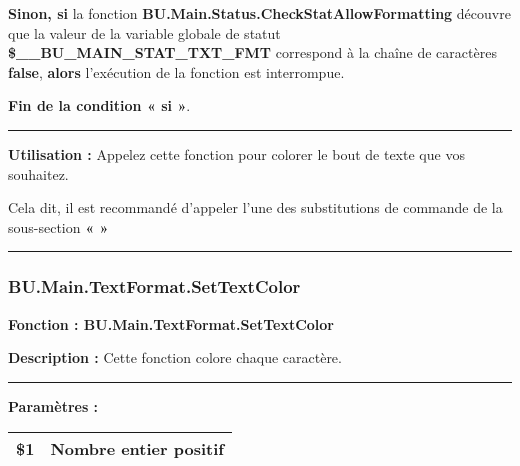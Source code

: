 \documentclass[a4paper,10pt]{article}
\begin{document}
\begin{justify}
    \textbf{\color{cond}Sinon, si} la fonction \textbf{\color{func}BU.Main.Status.CheckStatAllowFormatting} découvre que la valeur de la variable globale de statut \textbf{\color{vars}\$\_\_BU\_MAIN\_STAT\_TXT\_FMT} correspond à la chaîne de caractères \textbf{false}, \textbf{\color{cond}alors} l'exécution de la fonction est interrompue.
\end{justify}

\begin{justify}
    \textbf{\color{cond}Fin de la condition « si »}.
\end{justify}


\par\noindent\rule{\textwidth}{0.4pt}

\begin{justify}
    \textbf{Utilisation :} Appelez cette fonction pour colorer le bout de texte que vos souhaitez.
\end{justify}

\begin{justify}
    Cela dit, il est recommandé d'appeler l'une des substitutions de commande de la sous-section \textbf{\color{sec2}«  »}
\end{justify}






\color{sec3}\par\noindent\rule{\textwidth}{0.4pt}\color{text}

\color{sec3}
\subsubsection{BU.Main.TextFormat.SetTextColor}\color{text}

\begin{justify}
    \textbf{Fonction : \color{func}BU.Main.TextFormat.SetTextColor}
\end{justify}

\begin{justify}
    \textbf{Description :} Cette fonction colore chaque caractère.
\end{justify}


\par\noindent\rule{\textwidth}{0.4pt}

\begin{justify}
    \textbf{Paramètres :}

    \begin{tabular}{|l|l|}
        \hline
        \textbf{\color{orange}\$1} & Nombre entier positif\\
        \hline
    \end{tabular}
\end{justify}
\end{document}

